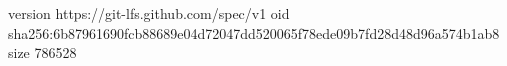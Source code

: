 version https://git-lfs.github.com/spec/v1
oid sha256:6b87961690fcb88689e04d72047dd520065f78ede09b7fd28d48d96a574b1ab8
size 786528
